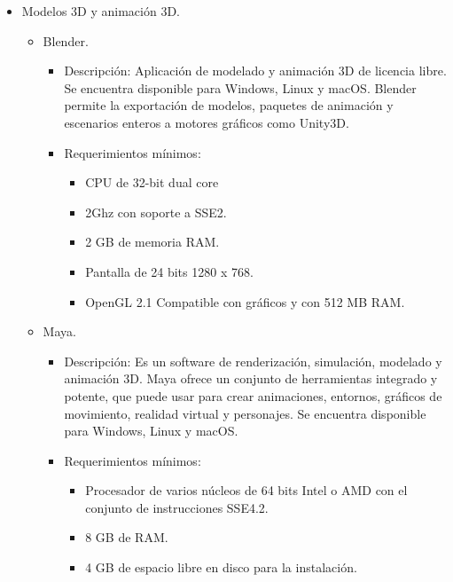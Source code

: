 \begin{itemize}
\begin{itemize}
\begin{itemize}
\begin{itemize}
							\end{itemize}
					\end{itemize}
			\end{itemize}
		\item Modelos 3D y animación 3D.
			\begin{itemize}
				\item Blender.
					\begin{itemize}
						\item Descripción: Aplicación de modelado y animación 3D de licencia libre. Se encuentra disponible para Windows, Linux y macOS. Blender permite la exportación de modelos, paquetes de animación y escenarios enteros a motores gráficos como Unity3D.
						\item Requerimientos mínimos:
							\begin{itemize}
								\item CPU de 32-bit dual core 								\item 2Ghz  con soporte a SSE2.
								\item 2 GB de memoria RAM.
								\item Pantalla de 24 bits 1280 x 768.
								\item OpenGL 2.1 Compatible con gráficos y con 512 MB RAM.
							\end{itemize}
					\end{itemize}
				\item Maya.
					\begin{itemize}
						\item Descripción: Es un software de renderización, simulación, modelado y animación 3D. Maya ofrece un conjunto de herramientas integrado y potente, que puede usar para crear animaciones, entornos, gráficos de movimiento, realidad virtual y personajes. Se encuentra disponible para Windows, Linux y macOS.
						\item Requerimientos mínimos:
							\begin{itemize}
								\item Procesador de varios núcleos de 64 bits Intel o AMD con el conjunto de instrucciones SSE4.2.
								\item 8 GB de RAM.
								\item 4 GB de espacio libre en disco para la instalación.
							\end{itemize}
					\end{itemize}
			\end{itemize}

\end{itemize}
